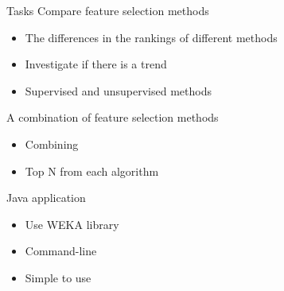 \begin{frame}{Tasks}
\bs
\bi
\mi Compare feature selection methods
\begin{itemize}
  \item The differences in the rankings of different methods
  \item Investigate if there is a trend
  \item Supervised and unsupervised methods
\end{itemize}
\mi A combination of feature selection methods
\begin{itemize}
  \item Combining
  \item Top N from each algorithm
\end{itemize}
\mi Java application
\begin{itemize}
  \item Use WEKA library
  \item Command-line
  \item Simple to use
\end{itemize}
\ei

\end{frame}